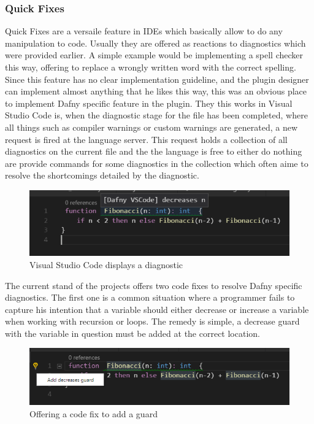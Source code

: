 \subsubsection{Quick Fixes} \label{quickfixes}
Quick Fixes are a versaile feature in IDEs which basically allow to do any manipulation to code. Usually they are offered as reactions to diagnostics which were provided earlier. A simple example would be implementing a spell checker this way, offering to replace a wrongly written word with the correct spelling. \newline
Since this feature has no clear implementation guideline, and the plugin designer can implement almost anything that he likes this way, this was an obvious place to implement Dafny specific feature in the plugin. \newline
They this works in Visual Studio Code is, when the diagnostic stage for the file has been completed, where all things such as compiler warnings or custom warnings are generated,  a new request is fired at the language server. This request holds a collection of all diagnostics on the current file and the the language is free to either do nothing are provide commands for some diagnostics in the collection which often aime to resolve the shortcomings detailed by the diagnostic. \newline
  \begin{figure}[H]
	\centering
	\includegraphics[width=1\textwidth]{img/diagnostic}
	\caption{Visual Studio Code displays a diagnostic}
	\label{fig:diagnostic}
\end{figure}
The current stand of the projects offers two code fixes to resolve Dafny specific diagnostics. \newline
The first one is a common situation where a programmer fails to capture his intention that a variable should either decrease or increase a variable when working with recursion or loops. The remedy is simple, a decrease guard with the variable in question must be added at the correct location. \newline
  \begin{figure}[H]
	\centering
	\includegraphics[width=1\textwidth]{img/decreaseGuard}
	\caption{Offering a code fix to add a guard}
	\label{fig:decreaseguard}
\end{figure}
